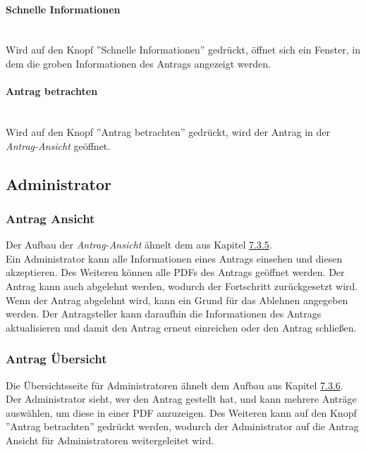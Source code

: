 \paragraph{Schnelle Informationen}~\\
Wird auf den Knopf ''Schnelle Informationen'' gedrückt, öffnet sich ein Fenster, in dem die groben Informationen des Antrags angezeigt werden.
\paragraph{Antrag betrachten}~\\
Wird auf den Knopf ''Antrag betrachten'' gedrückt, wird der Antrag in der \textit{Antrag-Ansicht} geöffnet.
\newpage
\subsection{Administrator}
\subsubsection{Antrag Ansicht}
Der Aufbau der \textit{Antrag-Ansicht} ähnelt dem aus Kapitel \hyperref[sec:antrag_ansicht]{7.3.5}.\\
Ein Administrator kann alle Informationen eines Antrags einsehen und diesen akzeptieren. Des Weiteren können alle PDFs des Antrags geöffnet werden. Der Antrag kann auch abgelehnt werden, wodurch der Fortschritt zurückgesetzt wird. Wenn der Antrag abgelehnt wird, kann ein Grund für das Ablehnen angegeben werden. Der Antragsteller kann daraufhin die Informationen des Antrags aktualisieren und damit den Antrag erneut einreichen oder den Antrag schließen.
\subsubsection{Antrag Übersicht}
Die Übersichtsseite für Administratoren ähnelt dem Aufbau aus Kapitel \hyperref[sec:antrag_uebersicht]{7.3.6}.\\
Der Administrator sieht, wer den Antrag gestellt hat, und kann mehrere Anträge auswählen, um diese in einer PDF anzuzeigen.
Des Weiteren kann auf den Knopf ''Antrag betrachten'' gedrückt werden, wodurch der Administrator auf die Antrag Ansicht für Administratoren weitergeleitet wird.
\newpage
